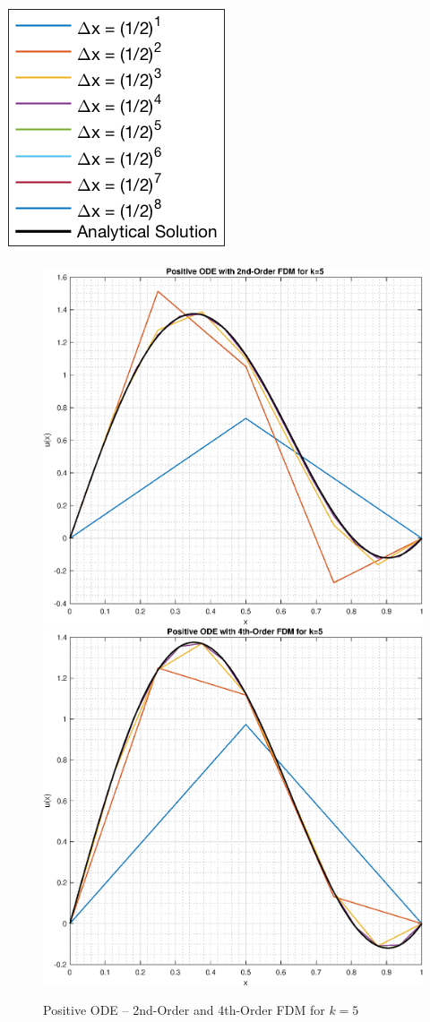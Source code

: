 \documentclass[10pt, reqno]{article}		%
\numberwithin{equation}{section}
\begin{document}
\begin{center}
	\includegraphics[height = 0.25\linewidth]{legend}
\end{center}

\newpage

\begin{figure}[H]
	\begin{center}
		\includegraphics[width = 0.49\linewidth]{positive_ode_order_2_k_5}
		\includegraphics[width = 0.49\linewidth]{positive_ode_order_4_k_5}
		\caption{Positive ODE -- 2nd-Order and 4th-Order FDM for $k = 5$}
	\end{center}
\end{figure}
\end{document}
